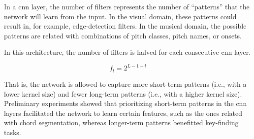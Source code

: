 
In a \gls{cnn} layer, the number of filters represents the
number of ``patterns'' that the network will learn from the
input. In the visual domain, these patterns could result in,
for example, edge-detection filters. In the musical domain,
the possible patterns are related with combinations of pitch
classes, pitch names, or onsets.

In this architecture, the number of filters is halved for
each consecutive \gls{cnn} layer. 

\begin{equation}
    \label{eq:number_of_filters}
    f_l = 2^{L - 1 - l}
\end{equation}

That is, the network is allowed to capture more short-term
patterns (i.e., with a lower kernel size) and fewer
long-term patterns (i.e., with a higher kernel size).
Preliminary experiments showed that prioritizing short-term
patterns in the \gls{cnn} layers facilitated the network to
learn certain features, such as the ones related with chord
segmentation, whereas longer-term patterns benefitted
key-finding tasks.
